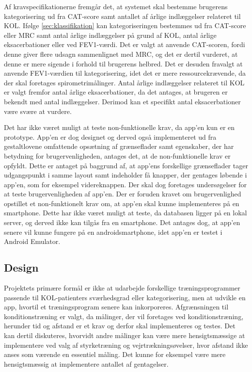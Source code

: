 Af kravspecifikationerne fremgår det, at systemet skal bestemme brugerens kategorisering ud fra CAT-score samt antallet af årlige indlæggelser relateret til KOL. Ifølge \autoref{sec:klassifikation} kan kategoriseringen bestemmes ud fra CAT-score eller MRC samt antal årlige indlæggelser på grund af KOL, antal årlige eksacerbationer eller ved FEV1-værdi. Det er valgt at anvende CAT-scoren, fordi denne giver flere udsagn sammenlignet med MRC, og det er dertil vurderet, at denne er mere sigende i forhold til brugerens helbred. Det er desuden fravalgt at anvende FEV1-værdien til kategorisering, idet det er mere ressourcekrævende, da der skal foretages spirometrimålinger. Antal årlige indlæggelser relateret til KOL er valgt fremfor antal årlige eksacerbationer, da det antages, at brugeren er bekendt med antal indlæggelser. Derimod kan et specifikt antal eksacerbationer være svære at vurdere. 


Det har ikke været muligt at teste non-funktionelle krav, da app’en kun er en prototype. App’en er dog designet og derved også implementeret ud fra gestaltlovene omfattende opsætning af grænseflader samt egenskaber, der har betydning for brugervenligheden, antages det, at de non-funktionelle krav er opfyldt. Dette er antaget på baggrund af, at app'ens forskellige grænseflader tager udgangspunkt i samme layout samt indeholder få knapper, der gentages løbende i app’en, som for eksempel videreknappen. Der skal dog foretages undersøgelser for at teste brugervenligheden af app'en. Der er foruden kravet om brugervenlighed opstillet et non-funktionelt krav om, at app'en skal kunne implementeres på en smartphone. Dette har ikke været muligt at teste, da databasen ligger på en lokal server, og derved ikke kan tilgås fra en smartphone. Det antages dog, at app'en senere vil kunne fungere på en androidsmartphone, idet app'en er testet i Android Emulator.

\subsection{Design}
Projektets primære formål er ikke at udarbejde forskellige træningsprogrammer passende til KOL-patienters sværhedsgrad eller kategorisering, men at udvikle en app, hvortil et træningsprogram senere kan inkorporeres. Afgrænsningen til konditionstræning er valgt, da målinger, der vil foretages ved konditionstræning, herunder tid og afstand er et krav og derfor skal implementeres og testes. Det kan dertil diskuteres, hvorvidt andre målinger kan være mere hensigtsmæssige at implementere ved valg af styrketræning og vejrtrækningsøvelser, hvor afstand ikke anses som værende en essentiel måling. Det kunne for eksempel være mere hensigtsmæssig at implementere antallet af gentagelser. 


